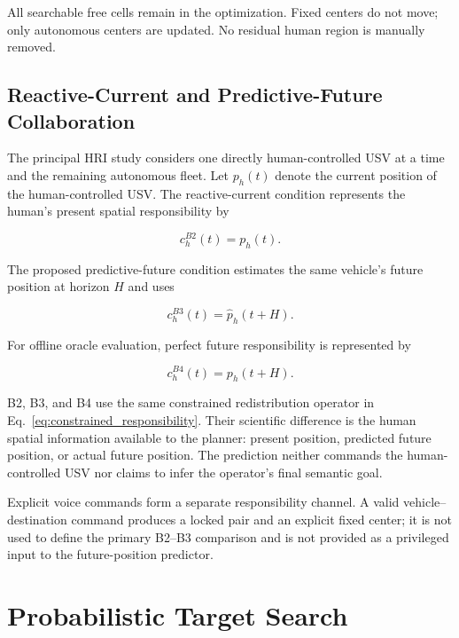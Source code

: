 \documentclass[conference]{IEEEtran}
\begin{document}
All searchable free cells remain in the optimization. Fixed centers do not
move; only autonomous centers are updated. No residual human region is manually
removed.

\subsection{Reactive-Current and Predictive-Future Collaboration}

The principal HRI study considers one directly human-controlled USV at a time
and the remaining autonomous fleet. Let $p_h(t)$ denote the current position of
the human-controlled USV. The reactive-current condition represents the
human's present spatial responsibility by

\begin{equation}
c_h^{B2}(t)=p_h(t).
\label{eq:b2_current_center}
\end{equation}

The proposed predictive-future condition estimates the same vehicle's future
position at horizon $H$ and uses

\begin{equation}
c_h^{B3}(t)=\hat p_h(t+H).
\label{eq:b3_predicted_center}
\end{equation}

For offline oracle evaluation, perfect future responsibility is represented by

\begin{equation}
c_h^{B4}(t)=p_h(t+H).
\label{eq:b4_oracle_center}
\end{equation}

B2, B3, and B4 use the same constrained redistribution operator in
Eq.~\eqref{eq:constrained_responsibility}. Their scientific difference is the
human spatial information available to the planner: present position,
predicted future position, or actual future position. The prediction neither
commands the human-controlled USV nor claims to infer the operator's final
semantic goal.

Explicit voice commands form a separate responsibility channel. A valid
vehicle--destination command produces a locked pair and an explicit fixed
center; it is not used to define the primary B2--B3 comparison and is not
provided as a privileged input to the future-position predictor.

\section{Probabilistic Target Search}
\end{document}
